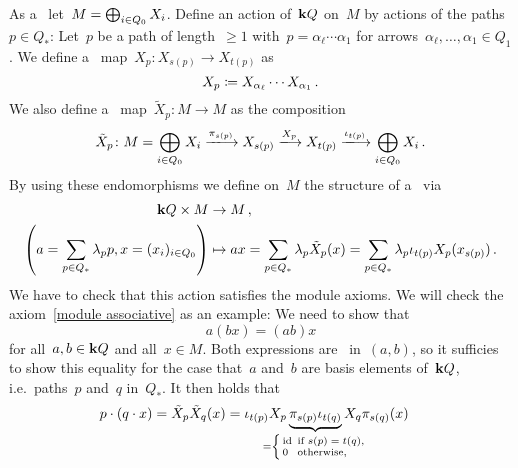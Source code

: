 \begin{remark}
\begin{enumerate}
      As a~{\module{$\kf$}} let~$M = \bigoplus_{i \in Q_0} X_i$.
      Define an action of~$\mathbf{k} Q$ on~$M$ by actions of the paths~$p \in Q_*$:
      Let~$p$ be a path of length~$\geq 1$ with~$p = \alpha_\ell \dotsm \alpha_1$ for arrows~$\alpha_\ell, \dotsc, \alpha_1 \in Q_1$.
      We define a~{\klin} map~$X_p \colon X_{s(p)} \to X_{t(p)}$ as
      \[
                  X_p
        \coloneqq  X_{\alpha_\ell} \dotsm X_{\alpha_1} \,.
      \]
      We also define a~{\klin} map~$\tilde{X}_p \colon M \to M$ as the composition
      \[
          \tilde{X}_p
        \colon
          M
        =
          \bigdsum_{i \in Q_0} X_i
        \xlongto{\pi_{s(p)}}
          X_{s(p)}
        \xlongto{X_p}
          X_{t(p)}
        \xlongto{\iota_{t(p)}}
          \bigdsum_{i \in Q_0} X_i \,.
      \]
      By using these endomorphisms we define on~$M$ the structure of a~{} via
      \begin{align*}
              \mathbf{k} Q \times M
        &\to  M \,,
        \\
                  \left(
                    a = \sum_{p \in Q_*} \lambda_p p,
                    x = (x_i)_{i \in Q_0}
                  \right)
        &\mapsto  ax
         =        \sum_{p \in Q_*} \lambda_p \tilde{X}_p(x)
         =        \sum_{p \in Q_*} \lambda_p \iota_{t(p)} X_p( x_{s(p)} ) \,.
      \end{align*}
      We have to check that this action satisfies the module axioms.
      We will check the axiom~\ref{module associative} as an example:
      We need to show that
      \[
          a(bx)
        = (ab)x
      \]
      for all~$a, b \in \mathbf{k} Q$ and all~$x \in M$.
      Both expressions are~{\kbilin} in~$(a,b)$, so it sufficies to show this equality for the case that~$a$ and~$b$ are basis elements of~$\mathbf{k} Q$, i.e.\ paths~$p$ and~$q$ in~$Q_*$.
      It then holds that
      \begin{align*}
          p \cdot (q \cdot x)
        = \tilde{X}_p \tilde{X}_q(x)
        &= \iota_{t(p)} X_p
          \underbrace{ \pi_{s(p)} \iota_{t(q)} }_{\mathclap{
            = \left\{
                \begingroup
                \renewcommand{\thickspace}{\kern 0.4em} %
                \begin{smallmatrix*}[l]
                  {\id} & \text{if~$s(p) = t(q)$},  \\
                  0     & \text{otherwise},
                \end{smallmatrix*}
                \endgroup
              \right.
          }}
          X_q \pi_{s(q)}(x)

\end{align*}
\end{enumerate}
\end{remark}

